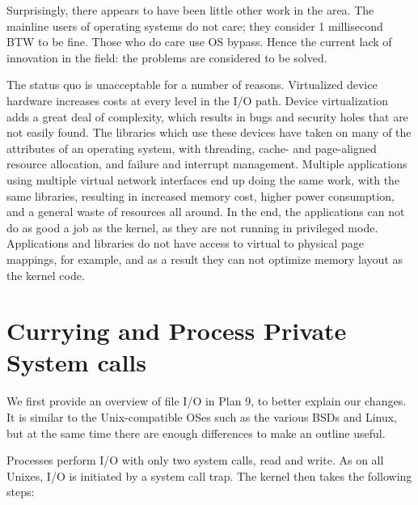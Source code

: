 \documentclass[a4,10pt,preprint]{sigplanconf}
\begin{document}
Surprisingly, there appears to have been little other work in the area. The mainline users of operating systems do not care; they consider 1 millisecond 
BTW to be fine. Those who do care use OS bypass. Hence the current lack of 
innovation in the field: the problems are considered to be solved. 

The status quo is unacceptable for a number of reasons. Virtualized device hardware increases costs at every level in the I/O path. Device
virtualization 
adds a great deal of complexity, which results in bugs and security holes that are not easily found. The libraries which use these 
devices have taken on many of the attributes of an operating system, with threading, cache- and page-aligned resource allocation, 
and failure and interrupt management. Multiple applications using multiple virtual network interfaces end up doing the same work, with the same
libraries, resulting in increased memory cost, higher power consumption, and a general waste of resources all around. In the end, the applications 
can not do as good a job as the kernel, as they are not running in privileged mode. Applications and libraries do not have access to
virtual to physical page mappings, for example, and as a result they can not optimize memory layout as the kernel code. 

\section{Currying and Process Private System calls}
We first provide an overview of file I/O in Plan 9, to better explain our changes. It is similar to the Unix-compatible OSes such as the various BSDs and Linux, 
but at the same time there are enough differences to make an outline useful. 

Processes perform I/O with only two system calls, read and write. As on all Unixes, I/O is initiated by a system call trap. 
The kernel then takes the following steps:
\end{document}
